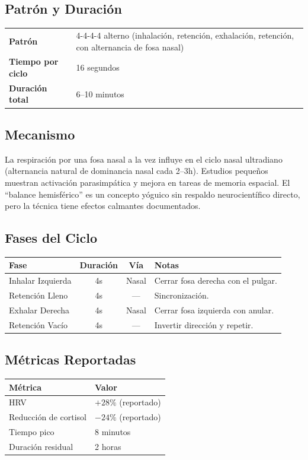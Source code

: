 \documentclass[12pt,a4paper]{article}
\begin{document}
\subsection*{Patrón y Duración}
\begin{tabularx}{\textwidth}{lX}
    \textbf{Patrón} & 4-4-4-4 alterno (inhalación, retención, exhalación, retención, con alternancia de fosa nasal) \\
    \textbf{Tiempo por ciclo} & 16 segundos \\
    \textbf{Duración total} & 6--10 minutos \\
\end{tabularx}

\subsection*{Mecanismo}
La respiración por una fosa nasal a la vez influye en el ciclo nasal ultradiano
(alternancia natural de dominancia nasal cada 2--3h). Estudios pequeños muestran
activación parasimpática y mejora en tareas de memoria espacial. El ``balance
hemisférico'' es un concepto yóguico sin respaldo neurocientífico directo, pero
la técnica tiene efectos calmantes documentados.

\subsection*{Fases del Ciclo}
\begin{tabularx}{\textwidth}{lccX}
    \toprule
    \textbf{Fase} & \textbf{Duración} & \textbf{Vía} & \textbf{Notas} \\
    \midrule
    Inhalar Izquierda & 4s & Nasal & Cerrar fosa derecha con el pulgar. \\
    Retención Lleno & 4s & — & Sincronización. \\
    Exhalar Derecha & 4s & Nasal & Cerrar fosa izquierda con anular. \\
    Retención Vacío & 4s & — & Invertir dirección y repetir. \\
    \bottomrule
\end{tabularx}

\subsection*{Métricas Reportadas}
\begin{tabularx}{\textwidth}{lX}
    \toprule
    \textbf{Métrica} & \textbf{Valor} \\
    \midrule
    HRV & $+28\%$ (reportado) \\
    Reducción de cortisol & $-24\%$ (reportado) \\
    Tiempo pico & 8 minutos \\
    Duración residual & 2 horas \\
    \bottomrule
\end{tabularx}
\end{document}
